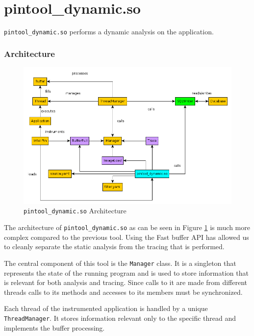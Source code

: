 \section{pintool\_dynamic.so}
\label{cap3:pintooldynamic}

\texttt{pintool\_dynamic.so} performs a dynamic analysis on the application.

\subsubsection{Architecture}

\begin{figure}
	\centering
	\includegraphics[width=1\textwidth]{dynamic-arch}
	\caption{\texttt{pintool\_dynamic.so} Architecture}
	\label{cap3:dynamic-arch}
\end{figure}

The architecture of \texttt{pintool\_dynamic.so} as can be seen in Figure \ref{cap3:dynamic-arch} is much more complex compared to the previous tool. Using the Fast buffer API has allowed us to cleanly separate the static analysis from the tracing that is performed.

The central component of this tool is the \texttt{Manager} class. It is a singleton that represents the state of the running program and is used to store information that is relevant for both analysis and tracing. Since calls to it are made from different threads calls to its methods and accesses to its members must be synchronized.

Each thread of the instrumented application is handled by a unique \texttt{ThreadManager}. It stores information relevant only to the specific thread and implements the buffer processing.

